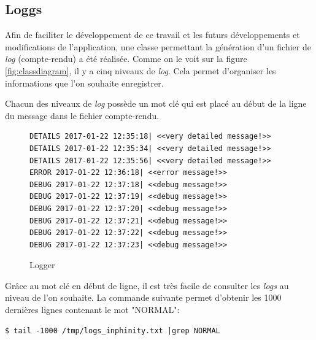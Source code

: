 \newpage
\subsection{Loggs}
Afin de faciliter le développement de ce travail et les futurs développements et modifications de l'application, une classe permettant la génération d'un fichier de \emph{log} (compte-rendu) a été réalisée. Comme on le voit sur la figure \ref{fig:classdiagram}, il y a cinq niveaux de \emph{log}. Cela permet d'organiser les informations que l'on souhaite enregistrer.

Chacun des niveaux de \emph{log} possède un mot clé qui est placé au début de la ligne du message dans le fichier compte-rendu.

\lstset{language=bash}

\begin{figure}[H] 
\centering 
\begin{lstlisting}[frame=single]
DETAILS 2017-01-22 12:35:18| <<very detailed message!>>
DETAILS 2017-01-22 12:35:34| <<very detailed message!>>
DETAILS 2017-01-22 12:35:56| <<very detailed message!>>
ERROR 2017-01-22 12:36:18| <<error message!>>
DEBUG 2017-01-22 12:37:18| <<debug message!>>
DEBUG 2017-01-22 12:37:19| <<debug message!>>
DEBUG 2017-01-22 12:37:20| <<debug message!>>
DEBUG 2017-01-22 12:37:21| <<debug message!>>
DEBUG 2017-01-22 12:37:22| <<debug message!>>
DEBUG 2017-01-22 12:37:23| <<debug message!>>
\end{lstlisting}
\caption[Logger]{Logger}
\label{fig:logger} 
\end{figure}

Grâce au mot clé en début de ligne, il est très facile de consulter les \emph{logs} au niveau de l'on souhaite. La commande suivante permet d'obtenir les 1000 dernières lignes contenant le mot "NORMAL":

\begin{lstlisting}[frame=single]
$ tail -1000 /tmp/logs_inphinity.txt |grep NORMAL
\end{lstlisting}













































